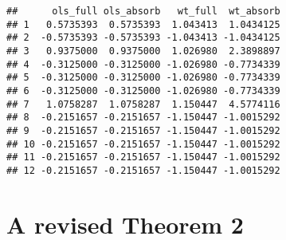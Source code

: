 \documentclass[12pt]{article}
\newenvironment{Shaded}{\begin{snugshade}}{\end{snugshade}}
\newcommand{\AttributeTok}[1]{\textcolor[rgb]{0.77,0.63,0.00}{#1}}
\newcommand{\CommentTok}[1]{\textcolor[rgb]{0.56,0.35,0.01}{\textit{#1}}}
\newcommand{\DecValTok}[1]{\textcolor[rgb]{0.00,0.00,0.81}{#1}}
\newcommand{\FunctionTok}[1]{\textcolor[rgb]{0.00,0.00,0.00}{#1}}
\newcommand{\NormalTok}[1]{#1}
\newcommand{\OtherTok}[1]{\textcolor[rgb]{0.56,0.35,0.01}{#1}}
\newcommand{\SpecialCharTok}[1]{\textcolor[rgb]{0.00,0.00,0.00}{#1}}
\newcommand{\StringTok}[1]{\textcolor[rgb]{0.31,0.60,0.02}{#1}}
\begin{document}
\begin{Shaded}
\end{Shaded}

\begin{verbatim}
##      ols_full ols_absorb   wt_full  wt_absorb
## 1   0.5735393  0.5735393  1.043413  1.0434125
## 2  -0.5735393 -0.5735393 -1.043413 -1.0434125
## 3   0.9375000  0.9375000  1.026980  2.3898897
## 4  -0.3125000 -0.3125000 -1.026980 -0.7734339
## 5  -0.3125000 -0.3125000 -1.026980 -0.7734339
## 6  -0.3125000 -0.3125000 -1.026980 -0.7734339
## 7   1.0758287  1.0758287  1.150447  4.5774116
## 8  -0.2151657 -0.2151657 -1.150447 -1.0015292
## 9  -0.2151657 -0.2151657 -1.150447 -1.0015292
## 10 -0.2151657 -0.2151657 -1.150447 -1.0015292
## 11 -0.2151657 -0.2151657 -1.150447 -1.0015292
## 12 -0.2151657 -0.2151657 -1.150447 -1.0015292
\end{verbatim}

\hypertarget{a-revised-theorem-2}{%
\section{A revised Theorem 2}\label{a-revised-theorem-2}}
\end{document}

